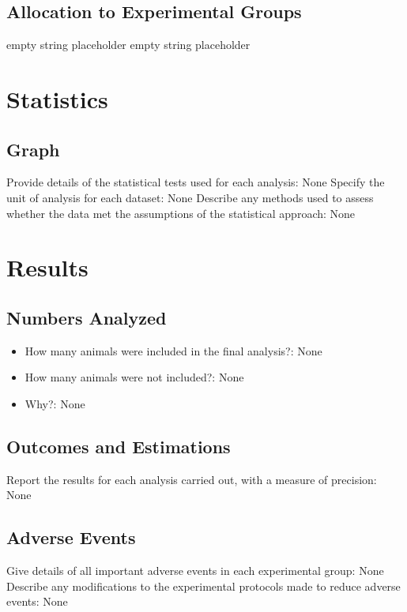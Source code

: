 \documentclass{article}%
\begin{document}
%
\subsection{Allocation to Experimental Groups}%
\label{subsec:Allocation to Experimental Groups}%
empty string placeholder%
empty string placeholder

%
\section{Statistics}%
\label{sec:Statistics}%
\subsection{Graph}%
\label{subsec:Graph}%
Provide details of the statistical tests used for each analysis: None%
Specify the unit of analysis for each dataset: None%
Describe any methods used to assess whether the data met the assumptions of the statistical approach: None

%
\section{Results}%
\label{sec:Results}%
\subsection{Numbers Analyzed}%
\label{subsec:Numbers Analyzed}%
\begin{itemize}%
\item%
How many animals were included in the final analysis?: None%
\item%
How many animals were not included?: None%
\item%
Why?: None%
\end{itemize}

%
\subsection{Outcomes and Estimations}%
\label{subsec:Outcomes and Estimations}%
Report the results for each analysis carried out, with a measure of precision: None

%
\subsection{Adverse Events}%
\label{subsec:Adverse Events}%
Give details of all important adverse events in each experimental group: None%
Describe any modifications to the experimental protocols made to reduce adverse events: None
\end{document}
